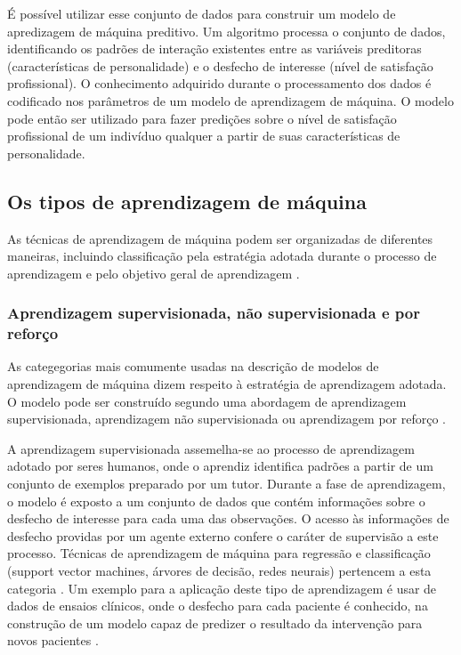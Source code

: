 É possível utilizar esse conjunto de dados para construir um modelo de apredizagem de máquina preditivo. Um algoritmo processa o conjunto de dados,
identificando os padrões de interação existentes entre as variáveis preditoras (características de personalidade) e o desfecho de interesse (nível
de satisfação profissional). O conhecimento adquirido durante o processamento dos dados é codificado nos parâmetros de um modelo de aprendizagem de
máquina. O modelo pode então ser utilizado para fazer predições sobre o nível de satisfação profissional de um indivíduo qualquer a partir de suas
características de personalidade.

\subsection{Os tipos de aprendizagem de máquina}
As técnicas de aprendizagem de máquina podem ser organizadas de diferentes maneiras, incluindo classificação pela estratégia adotada durante o processo
de aprendizagem e pelo objetivo geral de aprendizagem \cite{Theobald2021, Ng2001}.

\subsubsection{Aprendizagem supervisionada, não supervisionada e por reforço}
As categegorias mais comumente usadas na descrição de modelos de aprendizagem de máquina dizem respeito à estratégia de aprendizagem adotada. O
modelo pode ser construído segundo uma abordagem de aprendizagem supervisionada, aprendizagem não supervisionada ou aprendizagem por reforço
\cite{Theobald2021, Bi2019}.

A aprendizagem supervisionada assemelha-se ao processo de aprendizagem adotado por seres humanos, onde o aprendiz identifica padrões a partir de
um conjunto de exemplos preparado por um tutor. Durante a fase de aprendizagem, o modelo é exposto a um conjunto de dados que contém informações
sobre o desfecho de interesse para cada uma das observações. O acesso às informações de desfecho providas por um agente externo confere o caráter
de supervisão a este processo. Técnicas de aprendizagem de máquina para regressão e classificação (support vector machines, árvores de decisão,
redes neurais) pertencem a esta categoria \cite{Theobald2021, Bi2019}. Um exemplo para a aplicação deste tipo de aprendizagem é usar de dados de
ensaios clínicos, onde o desfecho para cada paciente é conhecido, na construção de um modelo capaz de predizer o resultado da intervenção para
novos pacientes \cite{Collins2023}.

